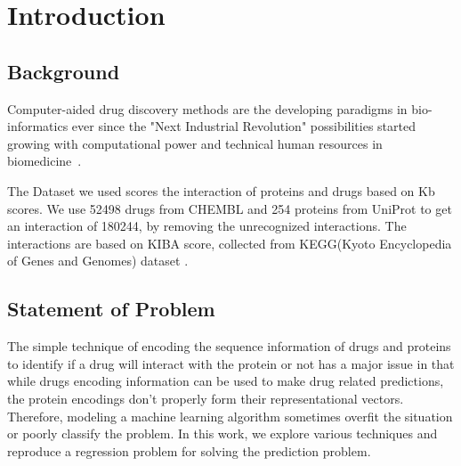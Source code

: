 \chapter{Introduction}
\section{Background}
Computer-aided drug discovery methods are the developing paradigms in bio-informatics ever since the "Next Industrial Revolution" possibilities started growing with computational power and technical human resources in biomedicine~\cite{Leelananda2016}.




\iffalse
(52498, 254)
180244
\fi
The Dataset we used scores the interaction of proteins and drugs based on Kb scores. We use 52498 drugs from CHEMBL and 254 proteins from UniProt to get an interaction of 180244, by removing the unrecognized interactions. The interactions are based on KIBA score, collected from KEGG(​Kyoto Encyclopedia of Genes and Genomes)​ dataset \cite{Kanehisa2000}.

\iffalse

For citations, use the function \textbackslash cite. \cite{gowar1989power} The references file is the sample.bib one. Google Scholar provides almost all the references in LaTeX form.

To insert a footnote, use the following command. \footnote{This is a footnote.} When necessary to use a nomenclature, define it on the same page for a better organization. Don't create NSN (Non-sense nomenclatures).

For figures, tables, equations and further information, open the file "tips.tex". If what you need is not found there, Google it.

\fi

\section{Statement of Problem}
The simple technique of encoding the sequence information of drugs and proteins to identify if a drug will interact with the protein or not has a major issue in that while drugs encoding information can be used to make drug related predictions, the protein encodings don't properly form their representational vectors. Therefore, modeling a machine learning algorithm sometimes overfit the situation or poorly classify the problem. In this work, we explore various techniques and reproduce a regression problem for solving the prediction problem.

